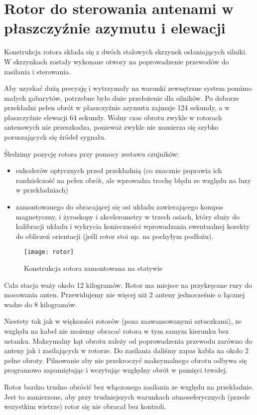 \section{Rotor do sterowania antenami w płaszczyźnie azymutu i elewacji}

Konstrukcja rotora składa się z dwóch stalowych skrzynek osłaniających silniki. W skrzynkach zostały wykonane otwory na poprowadzenie przewodów do zasilania i sterowania.

Aby uzyskać dużą precyzję i wytrzymały na warunki zewnętrzne system pomimo małych gabarytów, potrzebne było duże przełożenie dla silników. Po doborze przekładni pełen obrót w płaszczyźnie azymutu zajmuje 124 sekundy, a w płaszczyźnie elewacji 64 sekundy. Wolny czas obrotu zwykle w rotorach antenowych nie przeszkadza, ponieważ zwykle nie namierza się szybko poruszających się źródeł sygnału. 

Śledzimy pozycję rotora przy pomocy zestawu czujników: 
\begin{itemize}
 \item enkoderów optycznych przed przekładnią (co znacznie poprawia ich rozdzielczość na pełen obrót, ale wprowadza trochę błędu ze względu na luzy w przekładniach)
 \item zamontowanego do obracającej się osi układu zawierającego kompas magnetyczny, i żyroskopy i akcelerometry w trzech osiach, który służy do kalibracji układu i wykrycia konieczności wprowadzania ewentualnej korekty do obliczeń orientacji (jeśli rotor stoi np. na pochyłym podłożu).
\end{itemize}

\begin{figure}[!htbp]
 \texttt{[image: rotor]}
 \centering
 \caption{Konstrukcja rotora zamontowana na statywie}
\end{figure}

Cała stacja waży około 12 kilogramów. Rotor ma miejsce na przykręcane rury do mocowania anten. Przewidujemy nie więcej niż 2 anteny jednocześnie o łącznej wadze do 8 kilogramów.

Niestety tak jak w większości rotorów (poza zaawansowanymi sztuczkami), ze względu na kabel nie możemy obracać rotora w tym samym kierunku bez ustanku. Maksymalny kąt obrotu zależy od poprowadzenia przewodu zarówno do anteny jak i zasilających w rotorze. Do zasilania daliśmy zapas kabla na około 2 pełne obroty. Pilnowanie aby nie przekroczyć maksymalnego obrotu odbywa się programowo zapamiętując i wczytując względny obrót w pamięci trwałej. 

Rotor bardzo trudno obrócić bez włączonego zasilania ze względu na przekładnie. Jest to zamierzone, aby przy trudniejszych warunkach atmoseferycznych (przede wszystkim wietrze) rotor się nie obracał bez kontroli.
